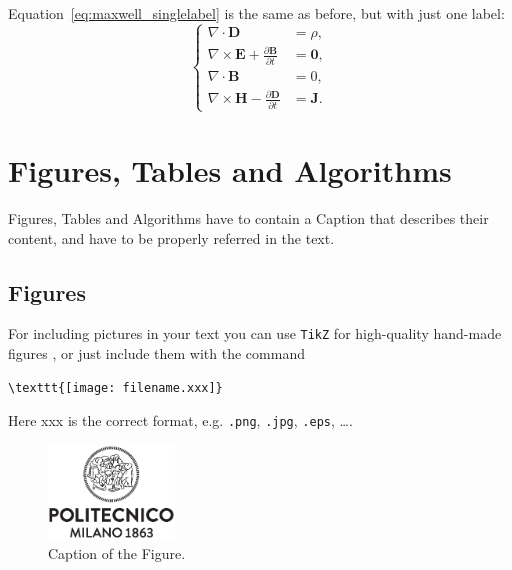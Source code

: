 \documentclass[11pt,a4paper]{article}
\begin{document}
Equation~\eqref{eq:maxwell_singlelabel} is the same as before,
but with just one label:
\begin{equation}
    \label{eq:maxwell_singlelabel}
    \left\{
    \begin{aligned}
        \nabla\cdot \bm{D}                                         & = \rho,   \\
        \nabla \times \bm{E} +  \frac{\partial \bm{B}}{\partial t} & = \bm{0}, \\
        \nabla\cdot \bm{B}                                         & = 0,      \\
        \nabla \times \bm{H} - \frac{\partial \bm{D}}{\partial t}  & = \bm{J}.
    \end{aligned}
    \right.
\end{equation}

\section{Figures, Tables and Algorithms}

Figures, Tables and Algorithms have to contain a Caption that describes their content, and have to be properly referred in the text.

\subsection{Figures}
\label{subsec:figures}

For including pictures in your text you can use \texttt{TikZ} for high-quality hand-made figures \cite{tikz},
or just include them with the command
\begin{verbatim}
\texttt{[image: filename.xxx]}
\end{verbatim}
Here xxx is the correct format, e.g.  \verb|.png|, \verb|.jpg|, \verb|.eps|, \dots.

\begin{figure}[H]
    \centering
    \includegraphics[width=0.3\textwidth]{logo_polimi_scritta.eps}
    \caption{Caption of the Figure.}
    \label{fig:quadtree}
\end{figure}
\end{document}
